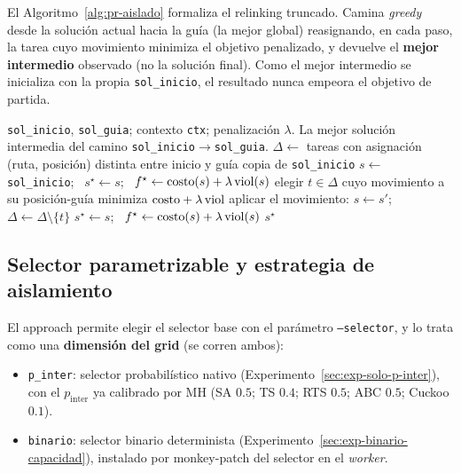 El Algoritmo~\ref{alg:pr-aislado} formaliza el relinking truncado. Camina
\emph{greedy} desde la solución actual hacia la guía (la mejor global)
reasignando, en cada paso, la tarea cuyo movimiento minimiza el objetivo
penalizado, y devuelve el \textbf{mejor intermedio} observado (no la solución
final). Como el mejor intermedio se inicializa con la propia
\texttt{sol\_inicio}, el resultado nunca empeora el objetivo de partida.

\begin{algorithm}[h]
\caption{Path Relinking truncado (hacia la mejor solución global).}
\label{alg:pr-aislado}
\begin{algorithmic}[1]
\Require \texttt{sol\_inicio}, \texttt{sol\_guia}; contexto \texttt{ctx};
  penalización $\lambda$.
\Ensure La mejor solución intermedia del camino \texttt{sol\_inicio}$\to$\texttt{sol\_guia}.
\State $\Delta \gets$ tareas con asignación (ruta, posición) distinta entre inicio y guía
\If{$\Delta = \varnothing$} \Return copia de \texttt{sol\_inicio} \EndIf
\State $s \gets$ \texttt{sol\_inicio}; \ $s^\star \gets s$; \
  $f^\star \gets \text{costo}(s) + \lambda\,\mathrm{viol}(s)$
  \State elegir $t \in \Delta$ cuyo movimiento a su posición-guía minimiza
    $\text{costo} + \lambda\,\mathrm{viol}$
  \State aplicar el movimiento: $s \gets s'$; \ $\Delta \gets \Delta \setminus \{t\}$
  \If{$\text{costo}(s) + \lambda\,\viol(s) < f^\star$}
    \State $s^\star \gets s$; \ $f^\star \gets \text{costo}(s) + \lambda\,\mathrm{viol}(s)$
  \EndIf
\EndFor
\State \Return $s^\star$
\end{algorithmic}
\end{algorithm}

\subsection{Selector parametrizable y estrategia de aislamiento}

El approach permite elegir el selector base con el parámetro
\texttt{--selector}, y lo trata como una \textbf{dimensión del grid} (se corren
ambos):

\begin{itemize}
\item \texttt{p\_inter}: selector probabilístico nativo
  (Experimento~\ref{sec:exp-solo-p-inter}), con el $p_{\text{inter}}$ ya
  calibrado por MH (SA $0.5$; TS $0.4$; RTS $0.5$; ABC $0.5$; Cuckoo $0.1$).
\item \texttt{binario}: selector binario determinista
  (Experimento~\ref{sec:exp-binario-capacidad}), instalado por monkey-patch del
  selector en el \emph{worker}.
\end{itemize}


